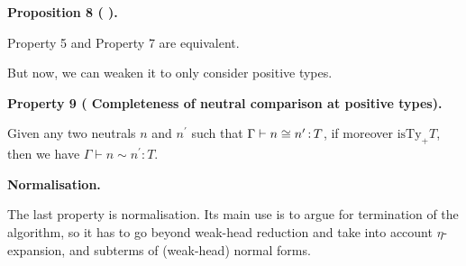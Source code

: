 \documentclass[10pt,a4paper]{amsart}
\begin{document}
 
 
 
\par\medskip\noindent\textbf{Proposition 8 ( ).}\par
 
 
Property 5 and Property 7 are equivalent.\par
 
 
 
 
But now, we can weaken it to only consider positive types.\par
 
 
 
\par\medskip\noindent\textbf{Property 9 (  Completeness of neutral comparison at positive types).}\par
 
 
Given any two neutrals $n$ and $n^{\prime}$ such that $\Gamma\vdash n\mathrel{\raisebox{-0.5pt}{$\cong$}}n^{\prime}\operatorname{%
\mathrel{:}}T$, if moreover $\operatorname{isTy_{+}}T$, then we have $\Gamma\vdash n\sim n^{\prime}\operatorname{\mathrel{:}}T$.\par
 
 
 
 
 
\par\medskip\noindent\textbf{Normalisation.}\par
 
 
The last property is normalisation. Its main use is to argue for termination of the algorithm, so it has to go beyond weak-head reduction and take into account $\eta$-expansion, and subterms of (weak-head) normal forms.\par
 
 
 
\end{document}
